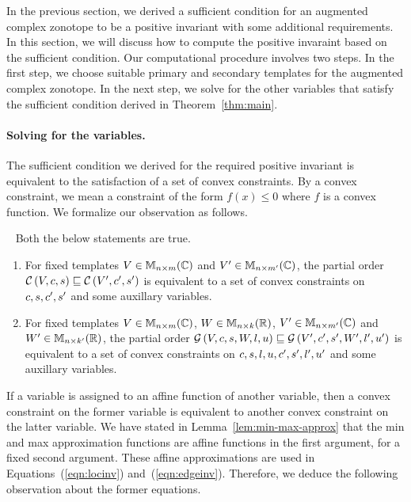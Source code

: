 In the previous section, we derived a sufficient condition for an
augmented complex zonotope to be a positive invariant with some
additional requirements.  In this section, we will discuss how to
compute the positive invaraint based on the sufficient condition.  Our
computational procedure involves two steps.  In the first step, we
choose suitable primary and secondary templates for the augmented
complex zonotope.  In the next step, we solve for the other variables
that satisfy the sufficient condition derived in
Theorem~\ref{thm:main}.

\paragraph{Solving for the variables.}  The sufficient condition we
derived for the required positive invariant is equivalent to the
satisfaction of a set of convex constraints.  By a convex constraint,
we mean a constraint of the form $f(x)\leq 0$ where $f$ is a convex
function.  We formalize our observation as follows.
%
\begin{proposition}~\label{prop:convex-inclusion}
Both the below statements are true.
\begin{enumerate}
\item For fixed templates $V\in\mathbb{M}_{n\times m}(\mathbb{\mathbb{C}})$ and
$V^\prime\in\mathbb{M}_{n\times m^\prime}(\mathbb{\mathbb{C}})$, the partial order
$\mathcal{C}\left(V,c,s\right)\sqsubseteq\mathcal{C}\left(V^\prime,c^\prime,s^\prime\right)$ is equivalent to a set of
convex constraints on $c,s,c^\prime,s^\prime$ and some auxillary variables.
\item For fixed templates $V\in\mathbb{M}_{n\times m}(\mathbb{\mathbb{C}})$,
$W\in\mathbb{M}_{n\times k}(\mathbb{\mathbb{R}})$, 
$V^\prime\in\mathbb{M}_{n\times m^\prime}(\mathbb{\mathbb{C}})$ and
$W^\prime\in\mathbb{M}_{n\times k^\prime}(\mathbb{\mathbb{R}})$, the partial order
$\mathcal{G}\left(V,c,s,W,l,u\right)\sqsubseteq\mathcal{G}\left(V^\prime,c^\prime,s^\prime,W^\prime,l^\prime,u^\prime\right)$
is equivalent to a set of convex constraints on
$c,s,l,u,c^\prime,s^\prime,l^\prime,u^\prime$ and some auxillary variables.
\end{enumerate}
\end{proposition}
%
If a variable is assigned to an affine function of another variable,
then a convex constraint on the former variable is equivalent to
another convex constraint on the latter variable.  We have stated in
Lemma~\ref{lem:min-max-approx} that the min and max approximation
functions are affine functions in the first argument, for a fixed
second argument.  These affine approximations are used in
Equations~(\ref{eqn:locinv}) and~(\ref{eqn:edgeinv}).  Therefore, we
deduce the following observation about the former equations.
%
